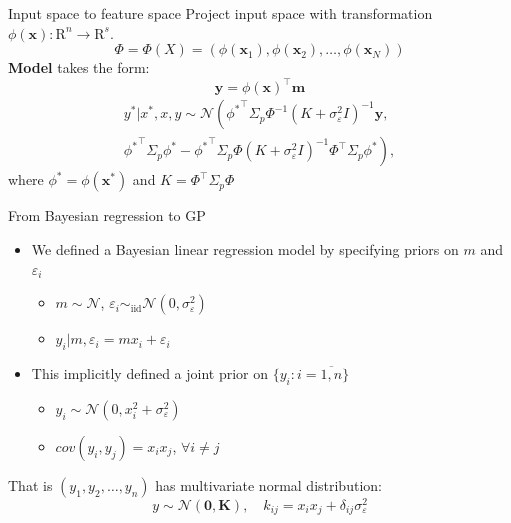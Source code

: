 \documentclass[12pt]{beamer}
\begin{document}
\begin{frame}{Input space to feature space}
Project input space with transformation $\phi(\mathbf{x})\colon \mathrm{R}^n \to \mathrm{R}^s$. $$\Phi= \Phi(X)=(\phi(\mathbf{x}_1),\phi(\mathbf{x}_2),\ldots, \phi(\mathbf{x}_N))$$
\pause
\textbf{Model} takes the form:
$$
\mathbf{y} = \phi(\mathbf{x})^{\intercal} \mathbf{m}
$$
\pause
\begin{multline*}
y^*|x^*,x,y \sim \mathcal{N}\left( {\phi^*}^{\intercal} \Sigma_p\Phi^{-1} (K+\sigma_{\varepsilon}^2 I)^{-1} \mathbf{y},\right.\\
\left.{\phi^*}^{\intercal} \Sigma_p {\phi^*} - {\phi^*}^{\intercal} \Sigma_p\Phi (K+\sigma_{\varepsilon}^2 I)^{-1} \Phi^{\intercal} \Sigma_p\phi^* \right),
\end{multline*}
\pause
where ${\phi^*} = \phi(\mathbf{x^*})$ and $K=\Phi^{\intercal}\Sigma_p\Phi$
\end{frame}


\begin{frame}{From Bayesian regression to GP }
\begin{itemize}
    \item We defined a Bayesian linear regression model by specifying priors on $m$ and $\varepsilon_i$\pause
    \begin{itemize}
        \item $m\sim \mathcal{N}$, $\varepsilon_i \sim_{\text{iid}} \mathcal{N}(0, \sigma_{\varepsilon}^2)$\pause
        \item $y_i|m,\varepsilon_i = m x_i + \varepsilon_i$\pause
    \end{itemize}
    \item This implicitly defined a joint prior on $\{y_i\colon i=\overline{1,n}\}$ \pause
    \begin{itemize}
        \item $y_i\sim \mathcal{N}(0,x_i^2 + \sigma_{\varepsilon}^2)$\pause
        \item $cov(y_i,y_j) = x_i x_j$, $\forall i\neq j$
    \end{itemize}
\end{itemize}
\pause
That is $(y_1, y_2, \ldots, y_n)$ has multivariate normal distribution:
$$
y\sim \mathcal{N}(\textbf{0},\textbf{K}), \quad k_{ij}=x_i x_j + \delta_{ij}\sigma_{\varepsilon}^2
$$
\end{frame}
\end{document}
